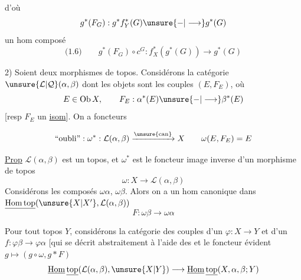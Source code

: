 d'où
\[
g^*(F_G):g^*f_Y^*(G)\unsure{-|\longrightarrow}g^*(G)
\]
un hom composé
\[
\text{(1.6)}\qquad g^*(F_G)\circ c^G:f_X^*(g^*(G))\longrightarrow g^*(G)
\]

2) Soient
deux morphismes de topos.  Considérons la catégorie $\unsure{\mathcal L|\mathcal Q}(\alpha,\beta)$ dont les objets sont les couples $(E,F_E)$, où 
\[
E\in\operatorname{Ob}X,\qquad F_E:\alpha^*(E)\unsure{-|\longrightarrow}\beta^*(E)
\]
[resp $F_E$ un \uline{isom}]. On a  foncteurs

\[
\text{``oubli''}:\omega^*:\mathcal L(\alpha,\beta)\xrightarrow{\unsure{\mathrm{can}}}X
\qquad\omega(E,F_E)=E
\]

\margin{$\big|$}
\uline{Prop} $\mathcal L(\alpha,\beta)$ est un topos, et $\omega^*$ est le foncteur image inverse d'un morphisme de topos
\[
\omega:X\longrightarrow\mathcal L(\alpha,\beta)
\]
\margin{$\big|$}
Considérons les composés $\omega\alpha$, $\omega\beta$. Alors on a un hom canonique  dans $\underline{\operatorname{Hom}\mathrm{top}}(\unsure{X|X'},\mathcal L(\alpha,\beta))$
\[
F:\omega\beta\longrightarrow\omega\alpha
\]

\margin{$\big|$}
Pour tout topos $Y$, considérons la catégorie  des  couples  d'un   $\varphi:X\longrightarrow Y$ et d'un $f:\varphi\beta\longrightarrow\varphi\alpha$ [qui se décrit abstraitement à l'aide des
et le foncteur évident $g\longmapsto(g\circ\omega,g*F)$
\[
\underline{\operatorname{Hom}}\,\underline{\mathrm{top}}(\mathcal L(\alpha,\beta),\unsure{X|Y})\longrightarrow\underline{\operatorname{Hom}}\,\underline{\mathrm{top}}(X,\alpha,\beta;Y)
\]
